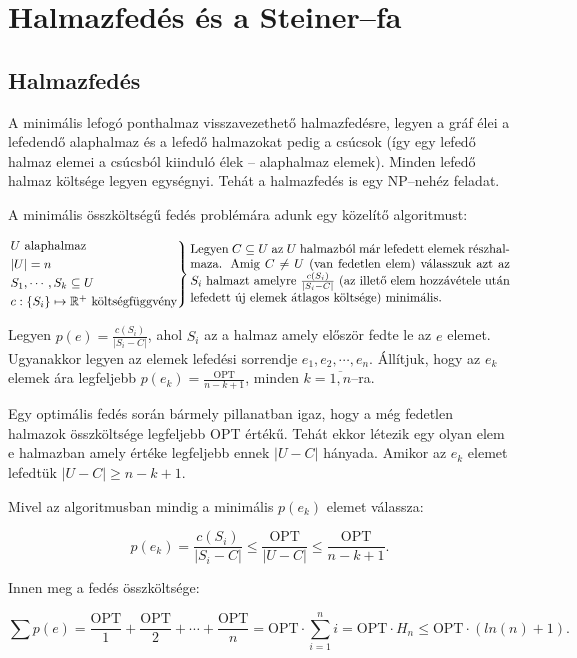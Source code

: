 \newpage
\section{Halmazfedés és a Steiner--fa}

\subsection{Halmazfedés}
A minimális lefogó ponthalmaz visszavezethető halmazfedésre, legyen a gráf élei
a lefedendő alaphalmaz és a lefedő halmazokat pedig a csúcsok (így egy lefedő
halmaz elemei a csúcsból kiinduló élek -- alaphalmaz elemek). Minden lefedő
halmaz költsége legyen egységnyi. Tehát a halmazfedés is egy NP--nehéz feladat.

A minimális összköltségű fedés problémára adunk egy közelítő algoritmust:

\[
\begin{rcases}
U \mbox{ alaphalmaz} \\
|U| = n \\
S_1, \cdots, S_k \subseteq U \\
c : \{ S_i\} \mapsto \mathbb{R}^+ \mbox{ költségfüggvény} \end{rcases}
\parbox[L]{9cm} { Legyen $C\subseteq U$ az $U$ halmazból már lefedett elemek
részhalmaza. Amig $C \neq U$ (van fedetlen elem) válasszuk azt az $S_i$ halmazt
amelyre $\frac{c(S_i)}{|S_i-C|}$ (az illető elem hozzávétele után lefedett új
elemek átlagos költsége) minimális.
}
\]

Legyen $p(e)=\frac{c(S_i)}{|S_i-C|}$, ahol $S_i$ az a halmaz amely először fedte
le az $e$ elemet. Ugyanakkor legyen az elemek lefedési sorrendje $e_1, e_2,
\cdots, e_n$. Állítjuk, hogy az $e_k$ elemek ára legfeljebb
$p(e_k)=\frac{\mbox{OPT}}{n-k+1}$, minden $k=\overline{1,n}$--ra.

Egy
optimális fedés során bármely pillanatban igaz, hogy a még fedetlen halmazok
összköltsége legfeljebb OPT értékű. Tehát ekkor létezik egy olyan elem e
halmazban amely értéke legfeljebb ennek $|U-C|$ hányada. Amikor az $e_k$ elemet
lefedtük $|U-C| \geq n-k+1$.

Mivel az algoritmusban mindig a minimális $p(e_k)$ elemet válassza:

\[p(e_k)=\frac{c(S_i)}{|S_i-C|} \leq \frac{\mbox{OPT}}{|U-C|} \leq  \frac{\mbox{OPT}}{n-k+1}.\]

Innen meg a fedés összköltsége:

\[\sum p(e) = \frac{\mbox{OPT}}{1} + \frac{\mbox{OPT}}{2} + \cdots + \frac{\mbox{OPT}}{n}= 
\mbox{OPT} \cdot \sum_{i=1}^n i = \mbox{OPT} \cdot H_n  \leq \mbox{OPT}  \cdot (ln(n)+1). \]

